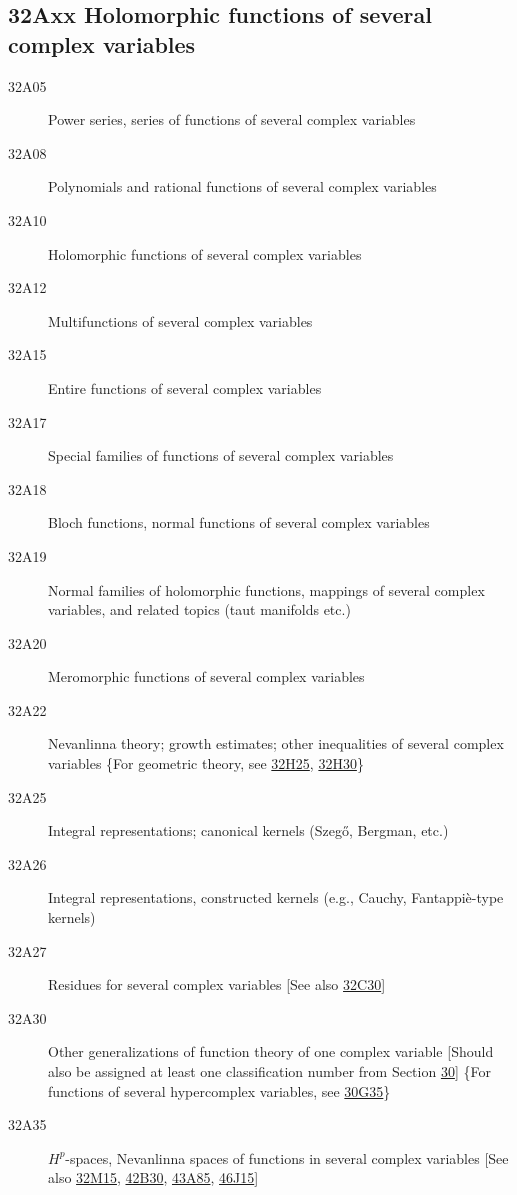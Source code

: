 \documentclass[letterpaper]{article}
\begin{document}
\subsection*{32Axx  Holomorphic functions of several complex variables }\label{32Axx}
\begin{description}  
\item [32A05]\label{32A05} Power series, series of functions of several complex variables
\item [32A08]\label{32A08} Polynomials and rational functions of several complex variables
\item [32A10]\label{32A10} Holomorphic functions of several complex variables
\item [32A12]\label{32A12} Multifunctions of several complex variables
\item [32A15]\label{32A15} Entire functions of several complex variables
\item [32A17]\label{32A17} Special families of functions of several complex variables
\item [32A18]\label{32A18} Bloch functions, normal functions of several complex variables
\item [32A19]\label{32A19} Normal families of holomorphic functions, mappings of several complex variables, and related topics (taut manifolds etc.)
\item [32A20]\label{32A20} Meromorphic functions of several complex variables
\item [32A22]\label{32A22} Nevanlinna theory; growth estimates; other inequalities of several complex variables \{For geometric theory, see \hyperref[32H25]{32H25}, \hyperref[32H30]{32H30}\}
\item [32A25]\label{32A25} Integral representations; canonical kernels (Szeg\H{o}, Bergman, etc.) 
\item [32A26]\label{32A26} Integral representations, constructed kernels (e.g., Cauchy, Fantappi\`{e}-type kernels)
\item [32A27]\label{32A27} Residues for several complex variables [See also \hyperref[32C30]{32C30}]
\item [32A30]\label{32A30} Other generalizations of function theory of one complex variable [Should also be assigned at least one classification number from Section \hyperref[30-XX]{30}] \{For functions of several hypercomplex variables, see \hyperref[30G35]{30G35}\}
\item [32A35]\label{32A35} $H^p$-spaces, Nevanlinna spaces of functions in several complex variables [See also \hyperref[32M15]{32M15}, \hyperref[42B30]{42B30}, \hyperref[43A85]{43A85}, \hyperref[46J15]{46J15}]

\end{description}
\end{document}
